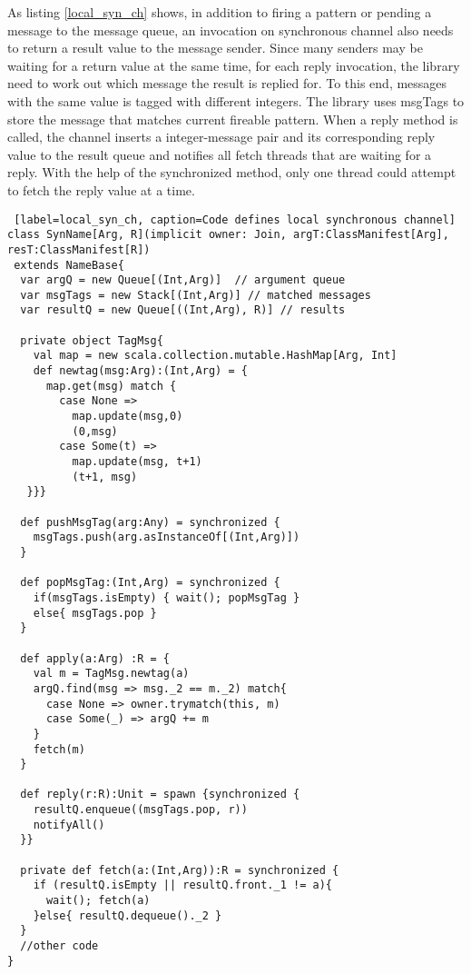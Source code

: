 As listing \ref{local_syn_ch} shows, in addition to firing a pattern or pending a message to the message queue, an invocation on synchronous channel also needs to return a result value to the message sender.  Since many senders may be waiting for a return value at the same time, for each reply invocation, the library need to work out which message the result is replied for.  To this end, messages with the same value is tagged with different integers.  The library uses msgTags to store the message that matches current fireable pattern.  When a reply method is called, the channel inserts a integer-message pair and its corresponding reply value to the result queue and notifies all fetch threads that are waiting for a reply.  With the help of the synchronized method, only one thread could attempt to fetch the reply value at a time.

\begin{lstlisting} [label=local_syn_ch, caption=Code defines local synchronous channel]
class SynName[Arg, R](implicit owner: Join, argT:ClassManifest[Arg], resT:ClassManifest[R])
 extends NameBase{
  var argQ = new Queue[(Int,Arg)]  // argument queue
  var msgTags = new Stack[(Int,Arg)] // matched messages
  var resultQ = new Queue[((Int,Arg), R)] // results

  private object TagMsg{
    val map = new scala.collection.mutable.HashMap[Arg, Int]
    def newtag(msg:Arg):(Int,Arg) = {
      map.get(msg) match {
        case None =>
          map.update(msg,0)
          (0,msg)
        case Some(t) =>
          map.update(msg, t+1)
          (t+1, msg)
   }}}

  def pushMsgTag(arg:Any) = synchronized {  
    msgTags.push(arg.asInstanceOf[(Int,Arg)])
  }
  
  def popMsgTag:(Int,Arg) = synchronized {
    if(msgTags.isEmpty) { wait(); popMsgTag }
    else{ msgTags.pop }
  }

  def apply(a:Arg) :R = {
    val m = TagMsg.newtag(a)
    argQ.find(msg => msg._2 == m._2) match{
      case None => owner.trymatch(this, m)
      case Some(_) => argQ += m
    }
    fetch(m)
  }
  
  def reply(r:R):Unit = spawn {synchronized {
    resultQ.enqueue((msgTags.pop, r))
    notifyAll()
  }}

  private def fetch(a:(Int,Arg)):R = synchronized {
    if (resultQ.isEmpty || resultQ.front._1 != a){
      wait(); fetch(a)
    }else{ resultQ.dequeue()._2 }
  }
  //other code
}
\end{lstlisting}




